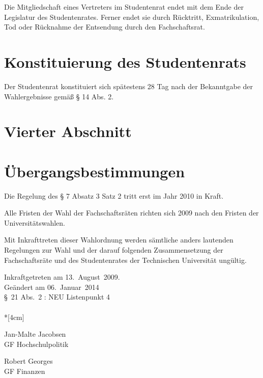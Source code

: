 \begin{multicols}{2}
\Abs \Satz Die Mitgliedschaft eines Vertreters im Studentenrat endet mit dem Ende der Legislatur des Studentenrates. Ferner endet sie durch Rücktritt, Exmatrikulation, Tod oder Rücknahme der Entsendung durch den Fachschaftsrat.

\section{Konstituierung des Studentenrats}
\Abs \Satz Der Studentenrat konstituiert sich spätestens 28 Tag nach der Bekanntgabe der Wahlergebnisse gemäß § 14 Abs. 2.

\section*{Vierter Abschnitt}
\section{Übergangsbestimmungen}
\Abs \Satz Die Regelung des § 7 Absatz 3 Satz 2 tritt erst im Jahr 2010 in Kraft.

\Abs \Satz Alle Fristen der Wahl der Fachschaftsräten richten sich 2009 nach den Fristen der Universitätswahlen.

\Abs \Satz Mit Inkrafttreten dieser Wahlordnung werden sämtliche anders lautenden Regelungen zur Wahl und der darauf folgenden Zusammensetzung der Fachschaftsräte und des Studentenrates der Technischen Universität ungültig.
\end{multicols}
\nopagebreak
\vspace{1cm}
Inkraftgetreten am 13.~August~2009.
\\ 
  

\footnotesize
Geändert am 06.~Januar~2014\\
§~21 Abs.~2 : NEU Listenpunkt 4\\

\normalsize
~\\*[4cm]
\begin{center}
\hspace*{\fill}
\parbox{7cm}{Jan-Malte Jacobsen\\GF Hochschulpolitik}
\hfill\parbox{7cm}{Robert Georges\\GF Finanzen}
\hspace*{\fill}
\end{center}     

